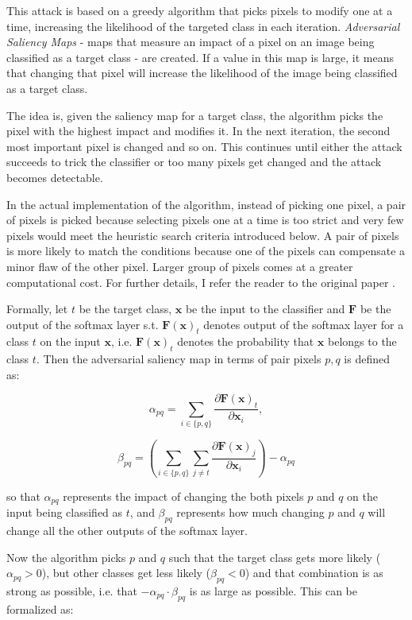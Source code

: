 This attack is based on a greedy algorithm that picks pixels to modify one at a time, increasing the likelihood of the targeted class in each iteration.  \textit{Adversarial Saliency Maps} - maps that measure an impact of a pixel on an image being classified as a target class - are created. If a value in this map is large, it means that changing that pixel will increase the likelihood of the image being classified as a target class. 

The idea is, given the saliency map for a target class, the algorithm picks the pixel with the highest impact and modifies it. In the next iteration, the second most important pixel is changed and so on. This continues until either the attack succeeds to trick the classifier or too many pixels get changed and the attack becomes detectable.

In the actual implementation of the algorithm, instead of picking one pixel, a pair of pixels is picked because selecting pixels one at a time is too strict and very few pixels would meet the heuristic search criteria introduced below. A pair of pixels is more likely to match the conditions because one of the pixels can compensate a minor flaw of the other pixel. Larger group of pixels comes at a greater computational cost. For further details, I refer the reader to the original paper \cite{DBLP:journals/corr/PapernotMJFCS15}.

Formally, let $t$ be the target class, $\pmb x$ be the input to the classifier and $\pmb F$ be the output of the softmax layer s.t. $ \pmb F(\pmb x)_t$ denotes output of the softmax layer for a class $t$ on the input $\pmb x$, i.e. $ \pmb F(\pmb x)_t$ denotes the probability that $\pmb x$ belongs to the class $t$. Then the adversarial saliency map in terms of pair pixels $p, q$ is defined as:

\[
\alpha_{pq} = \sum_{i \in \{p,q\}} \frac{\partial \pmb F(\pmb x)_t}{\partial \pmb x_i},
\]

\[
\beta_{pq} = ( \sum_{i \in \{p,q\}} \sum_{j \neq t} \frac{\partial \pmb F (\pmb x)_j }{\partial \pmb x _i}) - \alpha_{pq}
\]

so that $\alpha_{pq}$ represents the impact of changing the both pixels $p$ and $q$ on the input being classified as $t$, and $\beta_{pq}$ represents how
much changing $p$ and $q$ will change all the other outputs of the softmax layer.

Now the algorithm picks $p$ and $q$ such that the target class gets more likely ($\alpha_{pq} > 0$), but other classes get less likely ($\beta_{pq} < 0$) and that combination is as strong as possible, i.e. that $ - \alpha_{pq} \cdot \beta_{pq}$ is as large as possible. This can be formalized as:

